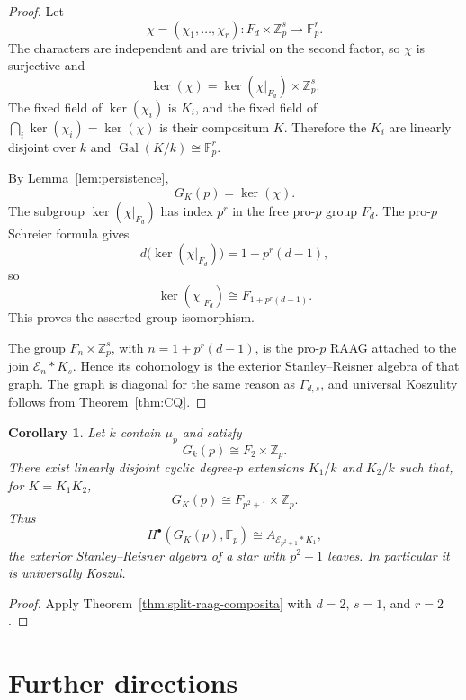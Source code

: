 \documentclass[12pt]{amsart}
\theoremstyle{plain}
\newtheorem{corollary}[theorem]{Corollary}
\theoremstyle{definition}
\theoremstyle{remark}
\numberwithin{equation}{section}
\newcommand{\Fp}{\mathbb{F}_p}
\begin{document}
\begin{proof}
Let
\[
\chi=(\chi_1,\dots,\chi_r):
F_d\times\mathbb Z_p^s\longrightarrow \Fp^r.
\]
The characters are independent and are trivial on the second factor,
so \(\chi\) is surjective and
\[
\ker(\chi)
=
\ker(\chi|_{F_d})\times\mathbb Z_p^s.
\]
The fixed field of \(\ker(\chi_i)\) is \(K_i\), and the fixed field of
\(\bigcap_i\ker(\chi_i)=\ker(\chi)\) is their compositum \(K\).
Therefore the \(K_i\) are linearly disjoint over \(k\) and
\(\operatorname{Gal}(K/k)\cong\Fp^r\).

By Lemma~\ref{lem:persistence},
\[
G_K(p)=\ker(\chi).
\]
The subgroup \(\ker(\chi|_{F_d})\) has index \(p^r\) in the free
pro-\(p\) group \(F_d\). The pro-\(p\) Schreier formula gives
\[
d\bigl(\ker(\chi|_{F_d})\bigr)
=1+p^r(d-1),
\]
so
\[
\ker(\chi|_{F_d})\cong F_{1+p^r(d-1)}.
\]
This proves the asserted group isomorphism.

The group \(F_n\times\mathbb Z_p^s\), with
\(n=1+p^r(d-1)\), is the pro-\(p\) RAAG attached to the join
\(\mathcal E_n\ast K_s\). Hence its cohomology is the exterior
Stanley--Reisner algebra of that graph. The graph is diagonal for the
same reason as \(\Gamma_{d,s}\), and universal Koszulity follows from
Theorem~\ref{thm:CQ}.
\end{proof}

\begin{corollary}
\label{cor:minimal-raag-compositum}
Let \(k\) contain \(\mu_p\) and satisfy
\[
G_k(p)\cong F_2\times\mathbb Z_p.
\]
There exist linearly disjoint cyclic degree-\(p\) extensions
\(K_1/k\) and \(K_2/k\) such that, for
\(K=K_1K_2\),
\[
G_K(p)\cong F_{p^2+1}\times\mathbb Z_p.
\]
Thus
\[
H^\bullet(G_K(p),\Fp)
\cong
A_{\mathcal E_{p^2+1}\ast K_1},
\]
the exterior Stanley--Reisner algebra of a star with \(p^2+1\)
leaves. In particular it is universally Koszul.
\end{corollary}

\begin{proof}
Apply Theorem~\ref{thm:split-raag-composita} with
\(d=2\), \(s=1\), and \(r=2\).
\end{proof}




\section{Further directions}
\label{sec:further}
\end{document}
